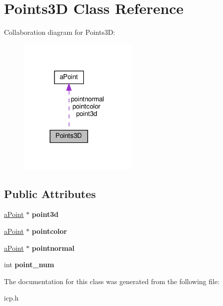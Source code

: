 \hypertarget{classPoints3D}{}\section{Points3D Class Reference}
\label{classPoints3D}


Collaboration diagram for Points3D\+:\nopagebreak
\begin{figure}[H]
\begin{center}
\leavevmode
\includegraphics[width=163pt]{classPoints3D__coll__graph}
\end{center}
\end{figure}
\subsection*{Public Attributes}
\begin{DoxyCompactItemize}
\item 
\mbox{\label{classPoints3D_ab83070a54a0f9857e76d20029c5c84f4}} 
\hyperlink{classaPoint}{a\+Point} $\ast$ {\bfseries point3d}
\item 
\mbox{\label{classPoints3D_af31fbf97956dcd4a50044942aa9b0d2f}} 
\hyperlink{classaPoint}{a\+Point} $\ast$ {\bfseries pointcolor}
\item 
\mbox{\label{classPoints3D_ad24b7ace9209a787875a7ba5d7d299e6}} 
\hyperlink{classaPoint}{a\+Point} $\ast$ {\bfseries pointnormal}
\item 
\mbox{\label{classPoints3D_a62b3884510bdabd40d1b6d70240a001f}} 
int {\bfseries point\+\_\+num}
\end{DoxyCompactItemize}


The documentation for this class was generated from the following file\+:\begin{DoxyCompactItemize}
\item 
icp.\+h\end{DoxyCompactItemize}
